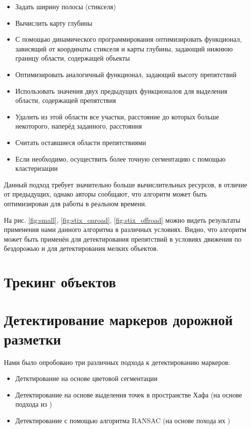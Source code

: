 \documentclass[aps,%
14pt,%
final,%
oneside,
onecolumn,%
musixtex, %
superscriptaddress,%
centertags]{extarticle} %
\begin{document}
\begin{itemize}
     \item Задать ширину полосы (стикселя)
     \item Вычислить карту глубины
     \item С помощью динамического программирования оптимизировать функционал, зависящий от координаты стикселя и карты глубины, задающий нижнюю границу области, содержащей объекты
     \item Оптимизировать аналогичный функционал, задающий высоту препятствий
     \item Использовать значения двух предыдущих функционалов для выделения области, содержащей препятствия
     \item Удалить из этой области все участки, расстояние до которых больше некоторого, наперёд заданного, расстояния
    \item Считать оставшиеся области препятствиями
    \item Если необходимо, осуществить более точную сегментацию с помощью кластеризации
\end{itemize}

Данный подход требует значительно больше вычислительных ресурсов, в отличие от предыдущих, однако авторы \cite{benenson2011stixels} сообщают, что алгоритм может быть оптимизирован для работы в реальном времени.

На рис. \ref{fig:small}, \ref{fig:stix_onroad}, \ref{fig:stix_offroad} можно видеть результаты применения нами данного алгоритма в различных условиях. Видно, что алгоритм может быть применён для детектирования препятствий в условиях движения по бездорожью и для детектирования мелких объектов.

\section{Трекинг объектов}

\section{ Детектирование маркеров дорожной разметки }
Нами было опробовано три различных подхода к детектированию маркеров:
\begin{itemize}
    \item Детктирование на основе цветовой сегментации
    \item Детектирование на основе выделения точек в пространстве Хафа (на основе подхода из \cite{song2017real} )
    \item Детектирование с помощью алгоритма RANSAC (на основе похода их \cite{aly2008real} )
\end{itemize}
\end{document}
